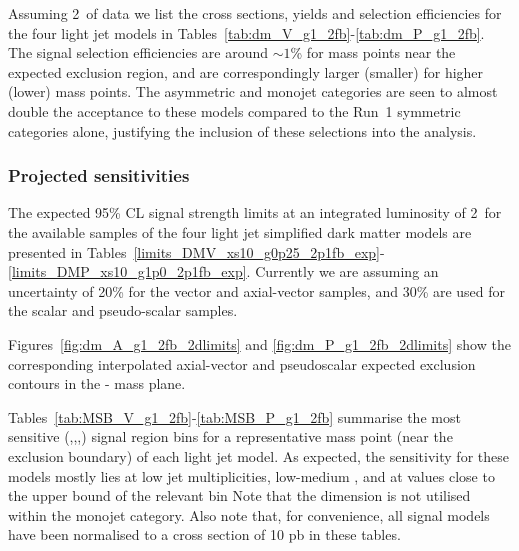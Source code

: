Assuming 2~\ifb of data we list the cross sections, yields and selection 
efficiencies for the four light jet models in
Tables~\ref{tab:dm_V_g1_2fb}-\ref{tab:dm_P_g1_2fb}. The signal selection
efficiencies are around $\sim 1$\% for mass points near the expected exclusion
region, and are correspondingly larger (smaller) for higher (lower) mass points.
The asymmetric and monojet categories are seen to almost double the acceptance
to these models compared to the Run~1 symmetric categories alone, justifying the
inclusion of these selections into the analysis.

\clearpage 
 \clearpage
 \clearpage
 \clearpage
 \clearpage


\subsubsection{Projected sensitivities}

The expected 95\% CL signal strength limits at an integrated luminosity of 2~\ifb for
the available samples of the four light jet simplified dark matter models are
presented in
Tables~\ref{limits_DMV_xs10_g0p25_2p1fb_exp}-\ref{limits_DMP_xs10_g1p0_2p1fb_exp}.
Currently we are assuming an uncertainty of 20\% for the vector and axial-vector samples, and 30\% are used 
for the scalar and pseudo-scalar samples.


Figures~\ref{fig:dm_A_g1_2fb_2dlimits} and \ref{fig:dm_P_g1_2fb_2dlimits} show
the corresponding interpolated axial-vector and pseudoscalar expected exclusion 
contours in the {\mphi-\mchi} mass plane.

Tables~\ref{tab:MSB_V_g1_2fb}-\ref{tab:MSB_P_g1_2fb} summarise the most sensitive
{(\njet,\nb,\scalht,\mht)} signal region 
bins for a representative mass point (near the exclusion boundary) of each light
jet model. As expected, the sensitivity for these models mostly lies at low jet
multiplicities, low-medium \scalht, and at \mht values close to the upper bound
of the relevant \scalht bin Note that the \mht dimension is not utilised within 
the monojet category. Also note that, for convenience, all signal models have 
been normalised to a cross section of 10 pb in these tables.



\clearpage
%
% 
%
%


